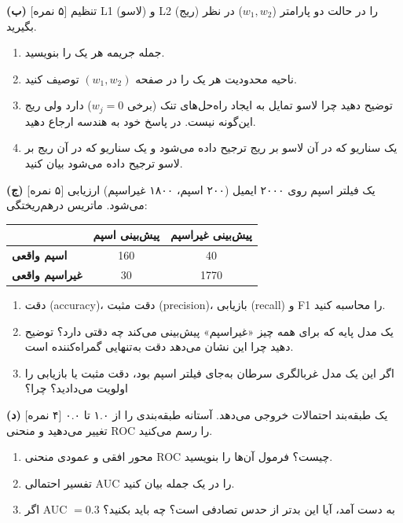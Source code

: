 \documentclass[12pt,a4paper]{article}
\begin{document}
\bigskip

\textbf{(ب)} [۵ نمره] تنظیم L1 (لاسو) و L2 (ریج) را در حالت دو پارامتر ($w_1, w_2$) در نظر بگیرید.

\begin{enumerate}[label=(\roman*)]
\item جمله جریمه هر یک را بنویسید.
\item ناحیه محدودیت هر یک را در صفحه $(w_1, w_2)$ توصیف کنید.
\item توضیح دهید چرا لاسو تمایل به ایجاد راه‌حل‌های تنک (برخی $w_j = 0$) دارد ولی ریج این‌گونه نیست. در پاسخ خود به هندسه ارجاع دهید.
\item یک سناریو که در آن لاسو بر ریج ترجیح داده می‌شود و یک سناریو که در آن ریج بر لاسو ترجیح داده می‌شود بیان کنید.
\end{enumerate}

\bigskip

\textbf{(ج)} [۵ نمره] یک فیلتر اسپم روی ۲۰۰۰ ایمیل (۲۰۰ اسپم، ۱۸۰۰ غیراسپم) ارزیابی می‌شود. ماتریس درهم‌ریختگی:

\begin{center}
\begin{tabular}{|l|c|c|}
\hline
 & پیش‌بینی اسپم & پیش‌بینی غیراسپم \\
\hline
\textbf{اسپم واقعی} & 160 & 40 \\
\hline
\textbf{غیراسپم واقعی} & 30 & 1770 \\
\hline
\end{tabular}
\end{center}

\begin{enumerate}[label=(\roman*)]
\item دقت (accuracy)، دقت مثبت (precision)، بازیابی (recall) و F1 را محاسبه کنید.
\item یک مدل پایه که برای همه چیز «غیراسپم» پیش‌بینی می‌کند چه دقتی دارد؟ توضیح دهید چرا این نشان می‌دهد دقت به‌تنهایی گمراه‌کننده است.
\item اگر این یک مدل غربالگری سرطان به‌جای فیلتر اسپم بود، دقت مثبت یا بازیابی را اولویت می‌دادید؟ چرا؟
\end{enumerate}

\bigskip

\textbf{(د)} [۴ نمره] یک طبقه‌بند احتمالات خروجی می‌دهد. آستانه طبقه‌بندی را از ۱.۰ تا ۰.۰ تغییر می‌دهید و منحنی ROC را رسم می‌کنید.

\begin{enumerate}[label=(\roman*)]
\item محور افقی و عمودی منحنی ROC چیست؟ فرمول آن‌ها را بنویسید.
\item تفسیر احتمالی AUC را در یک جمله بیان کنید.
\item اگر AUC $= 0.3$ به دست آمد، آیا این بدتر از حدس تصادفی است؟ چه باید بکنید؟
\end{enumerate}
\end{document}
